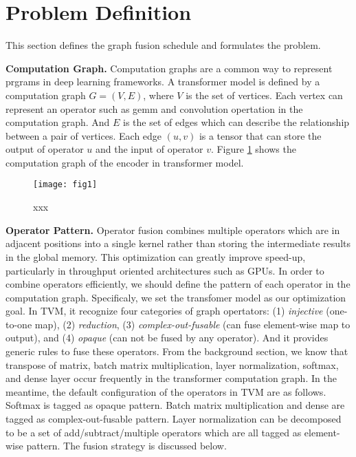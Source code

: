 \section{Problem Definition}

This section defines the graph fusion schedule and formulates the problem.

\textbf{Computation Graph.}
Computation graphs are a common way to represent prgrams in deep learning frameworks.
A transformer model is defined by a computation graph $G=(V, E)$, where $V$ is the set of vertices. Each vertex can represent an operator such as gemm and convolution
opertation in the computation graph. And $E$ is the set of edges which can describe the relationship between a pair of vertices. Each edge $(u, v)$ is a tensor that can 
store the output of operator $u$ and the input of operator $v$. 
Figure \ref{fig:fig1} shows the computation graph of the encoder in transformer model. \\

\begin{figure}[htbp]
    \centering
    \texttt{[image: fig1]}
    \caption{xxx}
    \label{fig:fig1}
\end{figure}


\textbf{Operator Pattern.}
Operator fusion combines multiple operators which are in adjacent positions into a single kernel rather than storing the intermediate results in the 
global memory. This optimization can greatly improve speed-up, particularly in throughput oriented architectures such as GPUs. In order to combine operators
efficiently, we should define the pattern of each operator in the computation graph. Specificaly, we set the transfomer model as our optimization goal. In TVM, 
it recognize four categories of graph opertators: (1) \textit{injective} (one-to-one map), (2) \textit{reduction}, (3) \textit{complex-out-fusable} (can fuse
element-wise map to output), and (4) \textit{opaque} (can not be fused by any operator). And it provides generic rules to fuse these operators. From
the background section, we know that transpose of matrix, batch matrix multiplication, layer normalization, softmax, and dense layer occur frequently in the 
transformer computation graph. In the meantime, the default configuration of the operators in TVM are as follows. Softmax is tagged as opaque pattern.
Batch matrix multiplication and dense are tagged as complex-out-fusable pattern. Layer normalization can be decomposed to be a set of add/subtract/multiple operators
which are all tagged as element-wise pattern. The fusion strategy is discussed below. \\


